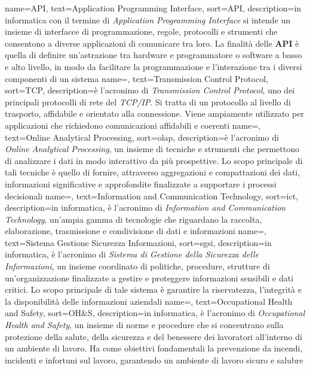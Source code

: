 {
    name={API},
    text=Application Programming Interface,
    sort=API,
    description={in informatica con il termine di \textit{Application Programming Interface} si intende un insieme di interfacce di 
    programmazione, regole, protocolli e strumenti che consentono a diverse applicazioni di comunicare tra loro. La finalità delle 
    \textbf{API} è quella di definire un'astrazione tra hardware e programmatore o software a basso e alto livello, in modo da facilitare
    la programmazione e l'interazione tra i diversi componenti di un sistema}
}
 {
    name=,
    text=Transmission Control Protocol,
    sort=TCP,
    description={è l'acronimo di \textit{Transmission Control Protocol}, uno dei principali protocolli di rete del \textit{TCP/IP}. Si tratta di un 
    protocollo al livello di trasporto, affidabile e orientato alla connessione. Viene ampiamente utilizzato per applicazioni 
    che richiedono comunicazioni affidabili e coerenti}
}
 {
    name=,
    text=Online Analytical Processing,
    sort=olap,
    description={è l'acronimo di \textit{Online Analytical Processing}, un insieme di tecniche e strumenti che permettono di analizzare i dati in modo 
    interattivo da più prospettive. Lo scopo principale di tali tecniche è quello di fornire, attraverso aggregazioni e compattazioni dei dati, informazioni 
    significative e approfondite finalizzate a supportare i processi decisionali}
}
 {
    name=,
    text=Information and Communication Technology,
    sort=ict,
    description={in informatica, è l'acronimo di \textit{Information and Communication Technology}, un'ampia gamma di tecnologie che riguardano la raccolta, 
    elaborazione, trasmissione e condivisione di dati e informazioni}
}
 {
    name=,
    text=Sistema Gestione Sicurezza Informazioni,
    sort=sgsi,
    description={in informatica, è l'acronimo di \textit{Sistema di Gestione della Sicurezza delle Informazioni}, un insieme coordinato di politiche, procedure, strutture di un'organizzazione finalizzate a 
    gestire e proteggere informazioni sensibili e dati critici. Lo scopo principale di tale sistema è garantire la riservatezza, l'integrità 
    e la disponibilità delle informazioni aziendali}
}
 {
    name=,
    text=Occupational Health and Safety,
    sort=OH\&S,
    description={in informatica, è l'acronimo di \textit{Occupational Health and Safety}, un insieme di norme e procedure che si concentrano 
    sulla protezione della salute, della sicurezza e del benessere dei lavoratori all'interno di un ambiente di lavoro. Ha come obiettivi 
    fondamentali la prevenzione da incendi, incidenti e infortuni sul lavoro, garantendo un ambiente di lavoro sicuro e salubre}
}
